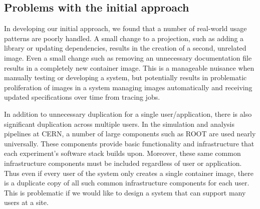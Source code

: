 \documentclass[sigconf]{acmart}
\begin{document}


\subsection{Problems with the initial approach}

In developing our initial approach,
we found that a number of real-world usage patterns are poorly handled.
A small change to a projection,
such as adding a library or updating dependencies,
results in the creation of a second, unrelated image.
Even a small change such as removing an unnecessary documentation file results in a completely new container image.
This is a manageable nuisance when manually testing or developing a system,
but potentially results in problematic proliferation of images in a system managing images automatically and receiving updated specifications over time from tracing jobs.

In addition to unnecessary duplication for a single user/application,
there is also significant duplication across multiple users.
In the simulation and analysis pipelines at CERN,
a number of large components such as ROOT are used nearly universally.
These components provide basic functionality and infrastructure that each experiment's software stack builds upon.
Moreover, these same common infrastructure components must be included regardless of user or application.
Thus even if every user of the system only creates a single container image,
there is a duplicate copy of all such common infrastructure components for each user.
This is problematic if we would like to design a system that can support many users at a site.
\end{document}
